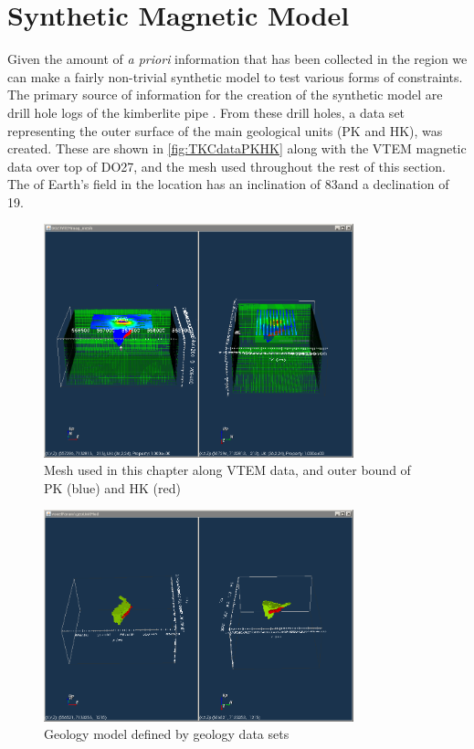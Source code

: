 \section{Synthetic Magnetic Model }
\label{sec:Synthetic Model:TKC}
%
Given the amount of \emph{a priori} information that has been collected in the region we can make a fairly non-trivial synthetic model to test various forms of constraints. The primary source of information for the creation of the synthetic model are drill hole logs of the kimberlite pipe \cite{eggleston2014peregrine}. From these drill holes, a data set representing the outer surface of the main geological units (PK and HK), was created. These are shown in \autoref{fig:TKCdataPKHK} along with the VTEM magnetic data over top of DO27, and the mesh used throughout the rest of this section. The of Earth's field in the location has an inclination of 83\degree and a declination of 19\degree.
%
\begin{figure} [h]
   \centering
   \includegraphics[width=0.8\textwidth]{images/TKC/TKCdataPKHK.PNG}
   \caption{Mesh used in this chapter along VTEM data, and outer bound of PK (blue) and HK (red)}
   \label{fig:TKCdataPKHK}
\end{figure}
%

\begin{figure} [h]
   \centering
   \includegraphics[width=0.8\textwidth]{images/TKC/TKCgeoModel.PNG}
   \caption{Geology model defined by geology data sets}
   \label{fig:TKCgeoModel}
\end{figure}

